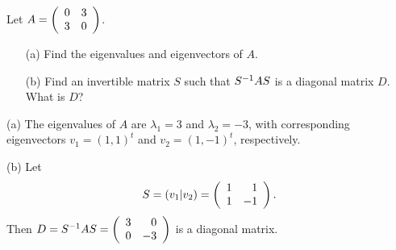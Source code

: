\documentclass{ximera}
\begin{document}
\begin{exercise} \label{c10.3.1}
Let $A=\left(\begin{array}{rr} 0 & 3\\ 3 &0\end{array}\right)$.  
\begin{itemize}
\item[(a)]  Find the eigenvalues and eigenvectors of $A$.
\item[(b)]  Find an invertible matrix $S$ such that $S^{-1} AS$ is a 
diagonal matrix $D$.  What is $D$?
\end{itemize}

\begin{solution}

\soln
(a) The eigenvalues of $A$ are $\lambda_1 = 3$ and $\lambda_2 = -3$,
with corresponding eigenvectors $v_1 = (1,1)^t$ and $v_2 = (1,-1)^t$,
respectively.

(b) Let
\[
S = (v_1|v_2) = \left(\begin{array}{rr} 1 & 1\\ 1 &-1\end{array}\right).
\]
Then $D = S^{-1}AS = \left(\begin{array}{rr} 3 & 0\\ 0 &-3\end{array}\right)$ is a diagonal matrix.

\end{solution}
\end{exercise}
\end{document}
